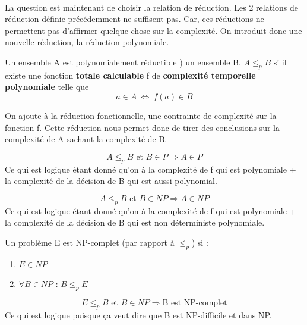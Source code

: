 \paragraph{} La question est maintenant de choisir la relation de réduction.
Les 2 relations de réduction définie précédemment ne suffisent pas. Car, ces
réductions ne permettent pas d'affirmer quelque chose sur la complexité. On
introduit donc une nouvelle réduction, la réduction polynomiale.

\begin{mydef}
	Un ensemble A est polynomialement réductible ) un ensemble B, $A \leq
	_p B$ s’ il existe une fonction \textbf{totale calculable} f de
	\textbf{complexité temporelle polynomiale} telle que 
	\[a\in A \ \Leftrightarrow \ f(a)\in B \]
\end{mydef}

\begin{myrem}
	On ajoute à la réduction fonctionnelle, une contrainte de complexité
	sur la fonction f. Cette réduction nous permet donc de tirer des
	conclusions sur la complexité de A sachant la complexité de B.
\end{myrem}

\begin{myprop}
	\[ A \leq_p B \text{ et } B\in P \Rightarrow A\in P \]
	Ce qui est logique étant donné qu'on à la complexité de f qui est
	polynomiale + la complexité de la décision de B qui est aussi
	polynomial.
\end{myprop}

\begin{myprop}
	\[ A \leq_p B \text{ et } B\in NP \Rightarrow A\in NP \]
	Ce qui est logique étant donné qu'on à la complexité de f qui est
	polynomiale + la complexité de la décision de B qui est non déterministe
	polynomiale.
\end{myprop}


\begin{mydef}[NP-complétude]
	Un problème E est NP-complet (par rapport à $\leq_p$) si :
	\begin{enumerate}
		\item $E\in NP$
		\item $\forall B \in NP$ : $B\leq_p E$
	\end{enumerate}
\end{mydef}

\begin{myprop}
	\[ E \leq_p B \text{ et } B\in NP \Rightarrow \text{B est NP-complet} \]
	Ce qui est logique puisque ça veut dire que B est NP-difficile et dans
	NP.
\end{myprop}

